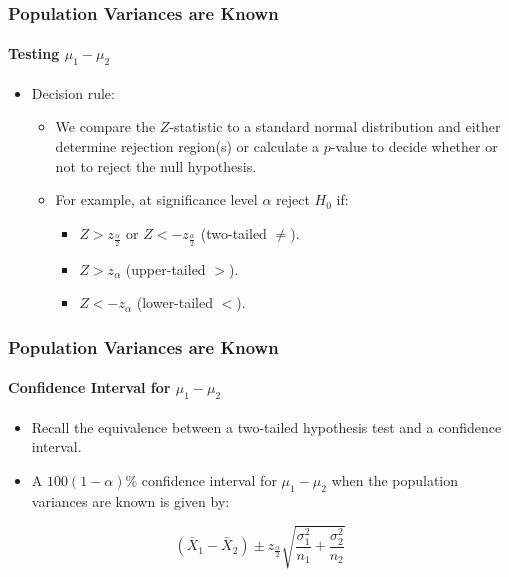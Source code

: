 \documentclass[12pt]{beamer}
\begin{document}
\begin{frame}
	\frametitle{Population Variances are Known}
	\framesubtitle{Testing $\mu_1 - \mu_2$}
	
	\begin{itemize}[label={\color{blue}$\blacktriangleright$}]
		\item Decision rule:
		\begin{itemize}[label={\color{blue}$\blacktriangleright$}]
			\item We compare the $Z$-statistic to a standard normal distribution and either determine rejection region(s) or calculate a $p$-value to decide whether or not to reject the null hypothesis.
			\item For example, at significance level $\alpha$ reject $H_0$ if:
			\begin{itemize}[label={\color{blue}$\blacktriangleright$}]
				\item $Z > z_{\frac{\alpha}{2}}$ or $Z < -z_{\frac{\alpha}{2}}$ (two-tailed $\neq$).
				\item $Z > z_{\alpha}$ (upper-tailed $>$).
				\item $Z < -z_{\alpha}$ (lower-tailed $<$).
			\end{itemize}
		\end{itemize}
	\end{itemize}
	
\end{frame}
\begin{frame}
	\frametitle{Population Variances are Known}
	\framesubtitle{Confidence Interval for $\mu_1 - \mu_2$}
	
	\begin{itemize}[label={\color{blue}$\blacktriangleright$}]
		\item Recall the equivalence between a two-tailed hypothesis test and a confidence interval.
		\item A $100(1 - \alpha)\%$ confidence interval for $\mu_1 - \mu_2$ when the population variances are known is given by:
	\end{itemize}
	
	
	\[
	(\bar{X}_1 - \bar{X}_2) \pm z_{\frac{\alpha}{2}} \sqrt{\frac{\sigma_1^2}{n_1} + \frac{\sigma_2^2}{n_2}}
	\]
	
\end{frame}
\end{document}
